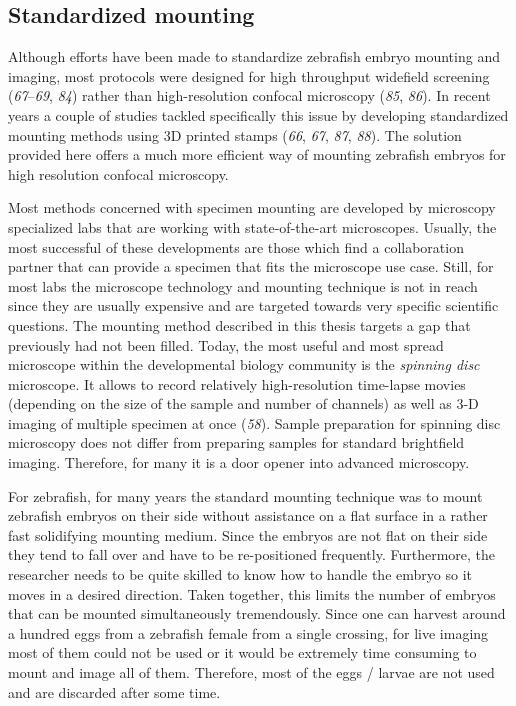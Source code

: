 \documentclass[11pt,singlespacinge,twoside]{reedthesis} %
\theoremstyle{definition}
\theoremstyle{definition}
\theoremstyle{definition}
\theoremstyle{remark}
\begin{document}
\hypertarget{standardized-mounting}{%
\subsection{Standardized mounting}\label{standardized-mounting}}

Although efforts have been made to standardize zebrafish embryo mounting and imaging, most protocols were designed for high throughput widefield screening (\emph{67}--\emph{69}, \emph{84}) rather than high-resolution confocal microscopy (\emph{85}, \emph{86}). In recent years a couple of studies tackled specifically this issue by developing standardized mounting methods using 3D printed stamps (\emph{66}, \emph{67}, \emph{87}, \emph{88}). The solution provided here offers a much more efficient way of mounting zebrafish embryos for high resolution confocal microscopy.

Most methods concerned with specimen mounting are developed by microscopy specialized labs that are working with state-of-the-art microscopes. Usually, the most successful of these developments are those which find a collaboration partner that can provide a specimen that fits the microscope use case. Still, for most labs the microscope technology and mounting technique is not in reach since they are usually expensive and are targeted towards very specific scientific questions. The mounting method described in this thesis targets a gap that previously had not been filled. Today, the most useful and most spread microscope within the developmental biology community is the \emph{spinning disc} microscope. It allows to record relatively high-resolution time-lapse movies (depending on the size of the sample and number of channels) as well as 3-D imaging of multiple specimen at once (\emph{58}). Sample preparation for spinning disc microscopy does not differ from preparing samples for standard brightfield imaging. Therefore, for many it is a door opener into advanced microscopy.

For zebrafish, for many years the standard mounting technique was to mount zebrafish embryos on their side without assistance on a flat surface in a rather fast solidifying mounting medium. Since the embryos are not flat on their side they tend to fall over and have to be re-positioned frequently. Furthermore, the researcher needs to be quite skilled to know how to handle the embryo so it moves in a desired direction. Taken together, this limits the number of embryos that can be mounted simultaneously tremendously. Since one can harvest around a hundred eggs from a zebrafish female from a single crossing, for live imaging most of them could not be used or it would be extremely time consuming to mount and image all of them. Therefore, most of the eggs / larvae are not used and are discarded after some time.
\end{document}
